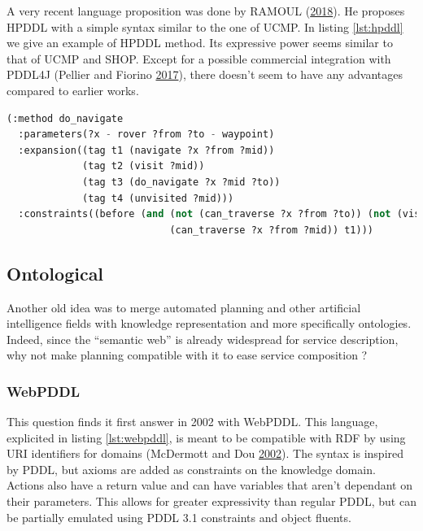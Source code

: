 \documentclass[11pt,a4paper,twoside,openright,titlepage,numbers=noenddot,headinclude,cleardoublepage=empty,openany]{scrreprt}
\theoremstyle{plain}
\theoremstyle{definition}
\theoremstyle{remark}
\begin{document}
A very recent language proposition was done by RAMOUL
(\protect\hyperlink{ref-ramoul_mixedinitiative_2018}{2018}). He proposes
HPDDL with a simple syntax similar to the one of UCMP. In
listing \ref{lst:hpddl} we give an example of HPDDL method. Its
expressive power seems similar to that of UCMP and SHOP. Except for a
possible commercial integration with PDDL4J (Pellier and Fiorino
\protect\hyperlink{ref-pellier_pddl4j_2017}{2017}), there doesn't seem
to have any advantages compared to earlier works.

\begin{lstlisting}[language=Lisp, caption={Example of HPDDL syntax as described by Ramoul.}, escapechar={$}, label=lst:hpddl]
(:method do_navigate
  :parameters(?x - rover ?from ?to - waypoint)
  :expansion((tag t1 (navigate ?x ?from ?mid))
             (tag t2 (visit ?mid))
             (tag t3 (do_navigate ?x ?mid ?to))
             (tag t4 (unvisited ?mid)))
  :constraints((before (and (not (can_traverse ?x ?from ?to)) (not (visited ?mid))
                            (can_traverse ?x ?from ?mid)) t1)))
\end{lstlisting}

\hypertarget{ontological}{%
\subsection{Ontological}\label{ontological}}

Another old idea was to merge automated planning and other artificial
intelligence fields with knowledge representation and more specifically
ontologies. Indeed, since the ``semantic web'' is already widespread for
service description, why not make planning compatible with it to ease
service composition ?

\hypertarget{webpddl}{%
\subsubsection{WebPDDL}\label{webpddl}}

This question finds it first answer in 2002 with WebPDDL. This language,
explicited in listing \ref{lst:webpddl}, is meant to be compatible with
RDF by using URI identifiers for domains (McDermott and Dou
\protect\hyperlink{ref-mcdermott_representing_2002}{2002}). The syntax
is inspired by PDDL, but axioms are added as constraints on the
knowledge domain. Actions also have a return value and can have
variables that aren't dependant on their parameters. This allows for
greater expressivity than regular PDDL, but can be partially emulated
using PDDL 3.1 constraints and object fluents.
\end{document}
